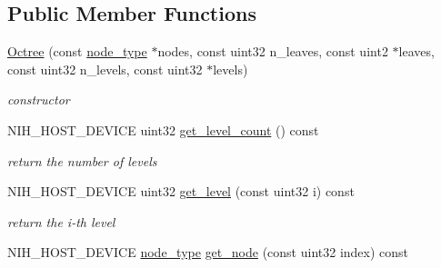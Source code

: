 \subsection*{\-Public \-Member \-Functions}
\begin{DoxyCompactItemize}
\item 
\hypertarget{structnih_1_1_octree_3_01breadth__first__tree_00_01_domain__type_01_4_ac6f5799aaf4597fa6c7157751078f16b}{
\hyperlink{structnih_1_1_octree_3_01breadth__first__tree_00_01_domain__type_01_4_ac6f5799aaf4597fa6c7157751078f16b}{\-Octree} (const \hyperlink{structnih_1_1_octree__node__base}{node\-\_\-type} $\ast$nodes, const uint32 n\-\_\-leaves, const uint2 $\ast$leaves, const uint32 n\-\_\-levels, const uint32 $\ast$levels)}
\label{structnih_1_1_octree_3_01breadth__first__tree_00_01_domain__type_01_4_ac6f5799aaf4597fa6c7157751078f16b}

\begin{DoxyCompactList}\small\item\em constructor \end{DoxyCompactList}\item 
\hypertarget{structnih_1_1_octree_3_01breadth__first__tree_00_01_domain__type_01_4_ae31b49e00bcdc117650147f3d48d6892}{
\-N\-I\-H\-\_\-\-H\-O\-S\-T\-\_\-\-D\-E\-V\-I\-C\-E uint32 \hyperlink{structnih_1_1_octree_3_01breadth__first__tree_00_01_domain__type_01_4_ae31b49e00bcdc117650147f3d48d6892}{get\-\_\-level\-\_\-count} () const }
\label{structnih_1_1_octree_3_01breadth__first__tree_00_01_domain__type_01_4_ae31b49e00bcdc117650147f3d48d6892}

\begin{DoxyCompactList}\small\item\em return the number of levels \end{DoxyCompactList}\item 
\hypertarget{structnih_1_1_octree_3_01breadth__first__tree_00_01_domain__type_01_4_a233f8b1c746cfd13abbec95dc638a477}{
\-N\-I\-H\-\_\-\-H\-O\-S\-T\-\_\-\-D\-E\-V\-I\-C\-E uint32 \hyperlink{structnih_1_1_octree_3_01breadth__first__tree_00_01_domain__type_01_4_a233f8b1c746cfd13abbec95dc638a477}{get\-\_\-level} (const uint32 i) const }
\label{structnih_1_1_octree_3_01breadth__first__tree_00_01_domain__type_01_4_a233f8b1c746cfd13abbec95dc638a477}

\begin{DoxyCompactList}\small\item\em return the i-\/th level \end{DoxyCompactList}\item 
\hypertarget{structnih_1_1_octree_3_01breadth__first__tree_00_01_domain__type_01_4_ad2a89c8ff37c30396c82203c5b6e037d}{
\-N\-I\-H\-\_\-\-H\-O\-S\-T\-\_\-\-D\-E\-V\-I\-C\-E \hyperlink{structnih_1_1_octree__node__base}{node\-\_\-type} \hyperlink{structnih_1_1_octree_3_01breadth__first__tree_00_01_domain__type_01_4_ad2a89c8ff37c30396c82203c5b6e037d}{get\-\_\-node} (const uint32 index) const }
\label{structnih_1_1_octree_3_01breadth__first__tree_00_01_domain__type_01_4_ad2a89c8ff37c30396c82203c5b6e037d}


\end{DoxyCompactItemize}

